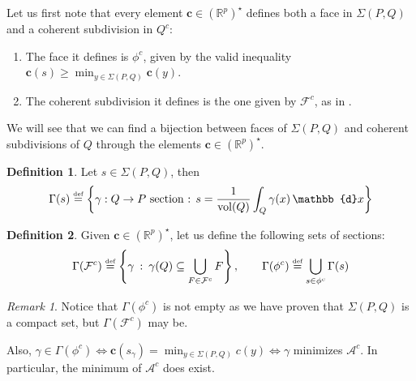\documentclass[10pt,a4paper]{article}
\DeclareMathOperator{\vol}{vol}
\def\defs{\stackrel{\tiny{\mbox{def}}}{=}}		%
\newcommand{\RR}{\mathbb{R}}
\theoremstyle{plain}
\theoremstyle{remark}
\newtheorem{remark}{Remark}
\theoremstyle{definition}
\newtheorem{definition}{Definition}
\begin{document}
Let us first note that every element $\bm{c}\in(\RR^p)^\star$ defines
both a face in $\Sigma(P,Q)$ and a coherent subdivision in $Q^c$:
\begin{enumerate}
	\item The face it defines is 
	$\phi^c$, given by the valid inequality 
	$\bm{c}(s) \geq \min_{y\in \Sigma(P,Q)} \bm{c}(y)$. 
	\item The coherent subdivision it defines is the one given by
	$\mathcal{F}^c$, as in \cite[Def. 9.2]{ziegler2012lectures}.
\end{enumerate}

We will see that we can find a bijection between 
faces of $\Sigma(P,Q)$ and coherent subdivisions of $Q$
through the elements $\bm{c}\in(\RR^p)^\star$.

\begin{definition}
	Let $s\in\Sigma(P,Q)$, then
	\begin{equation}
	\Gamma(s)\defs \left\{\gamma:Q\to P \mbox{ section : } 
	s = \frac{1}{\vol(Q)}\int_Q\gamma(x) \,\mathbb{d}x \right\}
	\end{equation}
\end{definition}
\begin{definition}
	Given $\bm{c}\in(\RR^p)^\star$, let us define the following sets of sections:
	\begin{equation}
	\Gamma(\mathcal{F}^c) \defs 
	\left\{ \gamma\::\: \gamma(Q)\subseteq \bigcup_{F\in \mathcal{F}^c} F \right\}, \qquad
	\Gamma(\phi^c) \defs 
	\bigcup_{s\in\phi^c} \Gamma(s) 
	\end{equation}
\end{definition}

\begin{remark} 
	\label{rmk:remarkAcMin}
	Notice that $\Gamma(\phi^c)$ is not empty
	as we have proven that $\Sigma(P,Q)$ is a compact set,
	but $\Gamma(\mathcal{F}^c)$ may be. \par
	Also, $\gamma\in \Gamma(\phi^c) \iff \bm{c}(s_\gamma) = \min_{y\in \Sigma(P,Q)}c(y) \iff \gamma$ minimizes $\mathcal{A}^c$. 
	In particular, the minimum of $\mathcal{A}^c$ does exist.
\end{remark}
 
\end{document}
